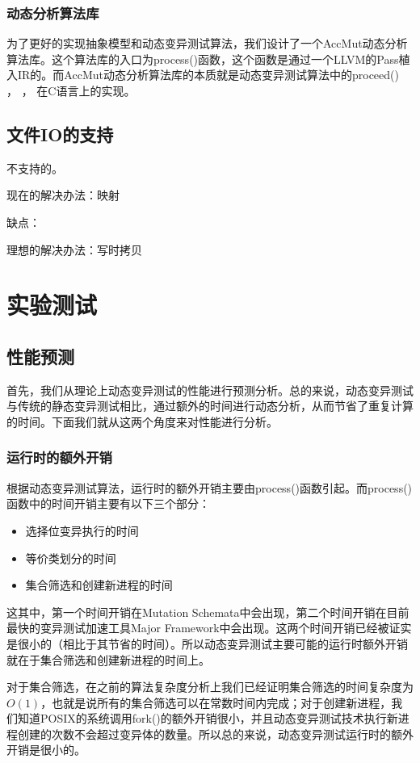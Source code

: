 \documentclass[nofonts]{ctexrep}
\begin{document}
\subsection{动态分析算法库}
为了更好的实现抽象模型和动态变异测试算法，我们设计了一个AccMut动态分析算法库。这个算法库的入口为process()函数，这个函数是通过一个LLVM的Pass植入IR的。而AccMut动态分析算法库的本质就是动态变异测试算法中的proceed() ， \filterv ， \filterm 在C语言上的实现。

\section{文件IO的支持}
不支持的。

现在的解决办法：映射

缺点：

理想的解决办法：写时拷贝

\chapter{实验测试}
\section{性能预测}
首先，我们从理论上动态变异测试的性能进行预测分析。总的来说，动态变异测试与传统的静态变异测试相比，通过额外的时间进行动态分析，从而节省了重复计算的时间。下面我们就从这两个角度来对性能进行分析。
\subsection{ 运行时的额外开销}
根据动态变异测试算法，运行时的额外开销主要由process()函数引起。而process()函数中的时间开销主要有以下三个部分：
\begin{itemize}
\item
选择位变异执行的时间
\item
等价类划分的时间
\item
集合筛选和创建新进程的时间
\end{itemize}
这其中，第一个时间开销在Mutation Schemata中会出现，第二个时间开销在目前最快的变异测试加速工具Major Framework中会出现。这两个时间开销已经被证实是很小的（相比于其节省的时间）。所以动态变异测试主要可能的运行时额外开销就在于集合筛选和创建新进程的时间上。

对于集合筛选，在之前的算法复杂度分析上我们已经证明集合筛选的时间复杂度为$O(1)$，也就是说所有的集合筛选可以在常数时间内完成；对于创建新进程，我们知道POSIX的系统调用fork()的额外开销很小，并且动态变异测试技术执行新进程创建的次数不会超过变异体的数量。所以总的来说，动态变异测试运行时的额外开销是很小的。
\end{document}
